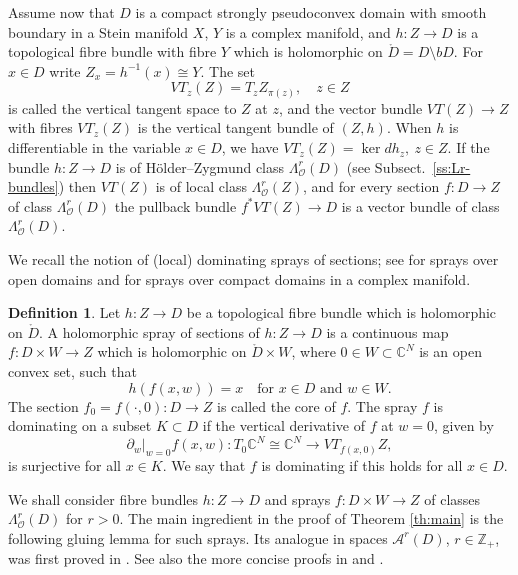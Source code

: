 \documentclass[11pt]{amsart}
\numberwithin{equation}{section}
\theoremstyle{definition}
\newtheorem{definition}[theorem]{Definition}
\newcommand\Ascr{\mathscr{A}}
\newcommand\Oscr{\mathscr{O}}
\newcommand\C{\mathbb{C}}
\newcommand\Z{\mathbb{Z}}
\newcommand\lra{\longrightarrow}
\newcommand\di{\partial}
\begin{document}
%
%
Assume now that $D$ is a compact strongly 
pseudoconvex domain with smooth boundary in a Stein manifold $X$,
$Y$ is a complex manifold, and $h:Z\to D$ is a topological fibre bundle
with fibre $Y$ which is holomorphic on $\mathring D=D\setminus bD$.
For $x\in D$ write $Z_x=h^{-1}(x)\cong Y$. The set
\[
	VT_z(Z) = T_z Z_{\pi(z)},\quad z\in Z 
\]
is called the vertical tangent space to $Z$ at $z$, 
and the vector bundle $VT(Z)\to Z$ with fibres $VT_z(Z)$ 
is the vertical tangent bundle of $(Z,h)$. 
When $h$ is differentiable in the variable $x\in D$, we have
$
	VT_z(Z) = \ker dh_z, \ z\in Z.
$
If the bundle $h:Z\to D$ is of H\"older--Zygmund class $\Lambda^r_\Oscr(D)$ 
(see Subsect.\ \ref{ss:Lr-bundles}) then $VT(Z)$ is of local 
class $\Lambda^r_\Oscr(Z)$, 
and for every section $f:D\to Z$ of class $\Lambda^r_\Oscr(D)$ the pullback
bundle $f^*VT(Z)\to D$ is a vector bundle of class $\Lambda^r_\Oscr(D)$.

We recall the notion of (local) dominating sprays of sections;
see \cite[Definition 5.9.1, p.\ 239]{Forstneric2017E} 
for sprays over open domains and \cite[Sect.\ 8.10]{Forstneric2017E} 
for sprays over compact domains in a complex manifold. 

%
%
\begin{definition}\label{def:fibre-spray}
Let $h:Z\to D$ be a topological fibre bundle which is holomorphic on $\mathring D$. 
A holomorphic spray of sections of $h:Z\to D$  
is a continuous map $f : D\times W\to Z$ which is 
holomorphic on $\mathring D\times W$, where $0\in W\subset \C^N$ 
is an open convex set, such that 
\begin{equation} \label{eq:spray}
        h(f(x,w)) = x\quad \text{for $x \in D$ and $w\in W$}.
\end{equation}
The section $f_0=f(\cdotp,0):D\to Z$ is called the core of $f$.
The spray $f$ is dominating on a subset $K \subset D$ 
if the vertical derivative of $f$ at $w=0$, given by
\[
    	\di_w|_{w=0} f(x,w) :  T_0 \C^N\cong \C^N  \lra  VT_{f(x,0)} Z,
\]
is surjective for all $x\in K$. We say that $f$ is dominating if this 
holds for all $x\in D$. 
\end{definition}

We shall consider fibre bundles $h:Z\to D$ 
and sprays $f:D\times W\to Z$ of classes $\Lambda^r_\Oscr(D)$ 
for $r>0$. The main ingredient in the proof of Theorem \ref{th:main}
is the following gluing lemma for such sprays. Its analogue
in spaces $\Ascr^r(D)$, $r\in\Z_+$, was first proved in 
\cite[Proposition 4.3]{DrinovecForstneric2007DMJ}. See also 
the more concise proofs in \cite[Proposition 2.4]{DrinovecForstneric2008FM} 
and \cite[Proposition 5.9.2]{Forstneric2017E}. 
\end{document}
